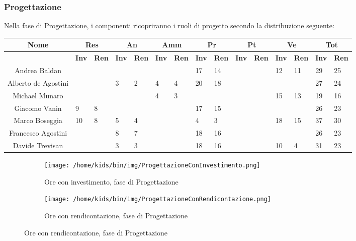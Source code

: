 \documentclass{scalatekids-article}
\begin{document}
\subsubsection{Progettazione}
Nella fase di Progettazione, i componenti ricopriranno i ruoli di progetto secondo la distribuzione seguente:
\begin{center}
  \scriptsize
  \begin{tabular}{| c | p{0.35cm}  p{0.35cm} | p{0.35cm}  p{0.35cm} | p{0.35cm}  p{0.35cm} | p{0.35cm}  p{0.35cm} | p{0.35cm}  p{0.35cm} | p{0.35cm}  p{0.35cm} | p{0.35cm}  p{0.35cm} |}
    \hline
    \textbf{Nome} & \multicolumn{2}{|c|}{\textbf{Res}} & \multicolumn{2}{|c|}{\textbf{An}} & \multicolumn{2}{|c|}{\textbf{Amm}} & \multicolumn{2}{|c|}{\textbf{Pr}} & \multicolumn{2}{|c|}{\textbf{Pt}} & \multicolumn{2}{|c|}{\textbf{Ve}} & \multicolumn{2}{|c|}{\textbf{Tot}}\\
    \hline
    & \textbf{Inv} & \textbf{Ren} & \textbf{Inv} & \textbf{Ren} & \textbf{Inv} & \textbf{Ren} & \textbf{Inv} & \textbf{Ren} & \textbf{Inv} & \textbf{Ren} & \textbf{Inv} & \textbf{Ren} & \textbf{Inv} & \textbf{Ren}\\
    \hline
    Andrea Baldan & & & & & & & 17 & 14 & & & 12 & 11 & 29 & 25\\
    Alberto de Agostini & & & 3 & 2 & 4 & 4 & 20 & 18 & & & & & 27 & 24\\
    Michael Munaro & & & & & 4 & 3 & & & & & 15 & 13 & 19 & 16\\
    Giacomo Vanin & 9 & 8 & & & & & 17 & 15 & & & & & 26 & 23\\
    Marco Boseggia & 10 & 8 & 5 & 4 & & & 4 & 3 & & & 18 & 15 & 37 & 30\\
    Francesco Agostini & & & 8 & 7 & & & 18 & 16 & & & & & 26 & 23\\
    Davide Trevisan & & & 3 & 3 & & & 18 & 16 & & & 10 & 4 & 31 & 23\\
    \hline
  \end{tabular}
\end{center}
\begin{figure}[H]
  \begin{subfigure}[H]{0.47\textwidth}
    \texttt{[image: /home/kids/bin/img/ProgettazioneConInvestimento.png]}
    \caption{Ore con investimento, fase di Progettazione}
  \end{subfigure}
  \qquad
  \begin{subfigure}[H]{0.47\textwidth}
    \texttt{[image: /home/kids/bin/img/ProgettazioneConRendicontazione.png]}
    \caption{Ore con rendicontazione, fase di Progettazione}
  \end{subfigure}
\end{figure}
\end{document}
